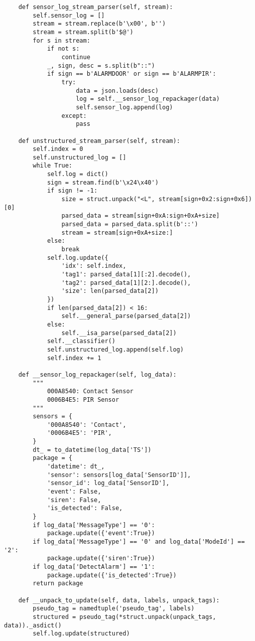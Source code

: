 \documentclass{easychair}
\begin{document}
\begin{enumerate}
\begin{lstlisting}
    def sensor_log_stream_parser(self, stream):
        self.sensor_log = []
        stream = stream.replace(b'\x00', b'')
        stream = stream.split(b'$@')
        for s in stream:
            if not s:
                continue
            _, sign, desc = s.split(b"::")
            if sign == b'ALARMDOOR' or sign == b'ALARMPIR':
                try:
                    data = json.loads(desc)
                    log = self.__sensor_log_repackager(data)
                    self.sensor_log.append(log)
                except:
                    pass

    def unstructured_stream_parser(self, stream):
        self.index = 0
        self.unstructured_log = []
        while True:
            self.log = dict()
            sign = stream.find(b'\x24\x40')
            if sign != -1:
                size = struct.unpack("<L", stream[sign+0x2:sign+0x6])[0]
                parsed_data = stream[sign+0xA:sign+0xA+size]
                parsed_data = parsed_data.split(b'::')
                stream = stream[sign+0xA+size:]
            else:
                break
            self.log.update({
                'idx': self.index,
                'tag1': parsed_data[1][:2].decode(),
                'tag2': parsed_data[1][2:].decode(),
                'size': len(parsed_data[2])
            })
            if len(parsed_data[2]) < 16:
                self.__general_parse(parsed_data[2])
            else:
                self.__isa_parse(parsed_data[2])
            self.__classifier()
            self.unstructured_log.append(self.log)
            self.index += 1

    def __sensor_log_repackager(self, log_data):
        """
            000A8540: Contact Sensor
            0006B4E5: PIR Sensor
        """
        sensors = {
            '000A8540': 'Contact',
            '0006B4E5': 'PIR',
        }
        dt_ = to_datetime(log_data['TS'])
        package = {
            'datetime': dt_,
            'sensor': sensors[log_data['SensorID']],
            'sensor_id': log_data['SensorID'],
            'event': False,
            'siren': False,
            'is_detected': False,
        }
        if log_data['MessageType'] == '0':
            package.update({'event':True})
        if log_data['MessageType'] == '0' and log_data['ModeId'] == '2':
            package.update({'siren':True})
        if log_data['DetectAlarm'] == '1':
            package.update({'is_detected':True})
        return package

    def __unpack_to_update(self, data, labels, unpack_tags):
        pseudo_tag = namedtuple('pseudo_tag', labels)
        structured = pseudo_tag(*struct.unpack(unpack_tags, data))._asdict()
        self.log.update(structured)


\end{lstlisting}
\end{enumerate}
\end{document}
